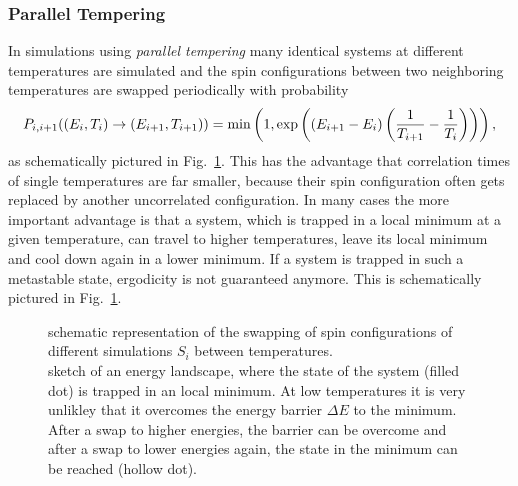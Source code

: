     \subsubsection{Parallel Tempering}
        In simulations using \emph{parallel tempering} \cite{ParallelTempering1986}
        many identical systems at different temperatures are simulated and
        the spin configurations between two neighboring temperatures are
        swapped periodically with probability \cite[p. 169ff]{NewmanBarkema1999} \cite[S. 155ff]{Katzgraber2011}
        \begin{equation}
            P_{i,i+1}((E_i,T_i) \to (E_{i+1},T_{i+1})) = \min\left(1,\exp\left(\left(E_{i+1}-E_i\right)\left(\frac{1}{T_{i+1}}-\frac{1}{T_i}\right)\right)\right),
            \label{eq:partemp}
        \end{equation}
        as schematically pictured in Fig.\ \ref{fig:parTemp}.
        This has the advantage that correlation times of single
        temperatures are far smaller, because their spin configuration
        often gets replaced by another uncorrelated configuration. In
        many cases the more important advantage is that a system, which
        is trapped in a local minimum at a given temperature, can travel
        to higher temperatures, leave its local minimum and cool down
        again in a lower minimum. If a system is trapped in such a
        metastable state, ergodicity is not guaranteed anymore.
        This is schematically pictured in Fig.\ \ref{fig:parTemp}.
        \begin{figure}[htbp]
            \centering
            \caption[Visualisation of the Parallel Tempering Algorithm]
            {
                 schematic representation of
                the swapping of spin configurations of different simulations \(S_i\)
                between temperatures.\\
                 sketch of an energy landscape, where
                the state of the system (filled dot) is trapped in an local
                minimum. At low temperatures it is very unlikley that it
                overcomes the energy barrier \(\Delta E\) to the minimum.
                After a swap to higher energies, the barrier can be overcome
                and after a swap to lower energies again, the state in
                the minimum can be reached (hollow dot).
            }
            \label{fig:parTemp}
        \end{figure}\\
